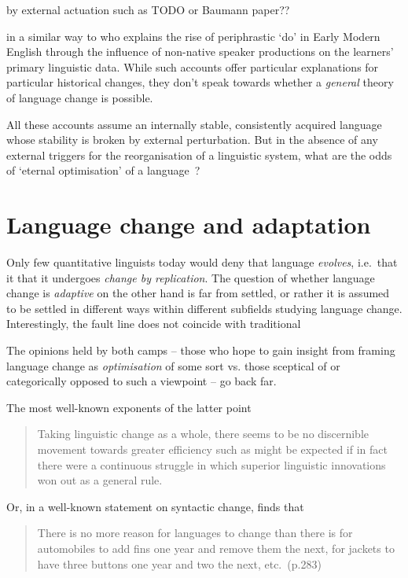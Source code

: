 by external actuation such as \citet{Ritt2004} TODO or Baumann paper??

in a similar way to \citet{Yang20??} who explains the rise of periphrastic `do' in Early Modern English through the influence of non-native speaker productions on the learners' primary linguistic data.
While such accounts offer particular explanations for particular historical changes, they don't speak towards whether a \emph{general} theory of language change is possible.

All these accounts assume an internally stable, consistently acquired language whose stability is broken by external perturbation. But in the absence of any external triggers for the reorganisation of a linguistic system, what are the odds of `eternal optimisation' of a language~\citep{Boersma2003}?

\section{Language change and adaptation}\label{sec:adaptationism}

Only few quantitative linguists today would deny that language \emph{evolves}, i.e.~that it that it undergoes \emph{change by replication}. The question of whether language change is \emph{adaptive} on the other hand is far from settled, or rather it is assumed to be settled in different ways within different subfields studying language change. Interestingly, the fault line does not coincide with traditional 



The opinions held by both camps -- those who hope to gain insight from framing language change as \emph{optimisation} of some sort vs. those sceptical of or categorically opposed to such a viewpoint -- go back far.

The most well-known exponents of the latter point 

\begin{quote}
Taking linguistic change as a whole, there seems to be no discernible movement towards greater efficiency such as might be expected if in fact there were a continuous struggle in which superior linguistic innovations won out as a general rule. \citep[p.69]{Greenberg1959}
\end{quote}
Or, in a well-known statement on syntactic change, \citet{Postal1968} finds that
\begin{quote}
There is no more reason for languages to change than there is for automobiles to add fins one year and remove them the next, for jackets to have three buttons one year and two the next, etc.~(p.283)
\end{quote}

